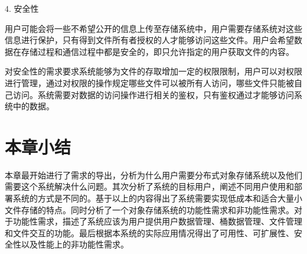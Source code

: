 4. 安全性

用户可能会将一些不希望公开的信息上传至存储系统中，用户需要存储系统对这些信息进行保护，只有得到文件所有者授权的人才能够访问这些文件。用户会希望数据在存储过程和通信过程中都是安全的，即只允许指定的用户获取文件的内容。

对安全性的需求要求系统能够为文件的存取增加一定的权限限制，用户可以对权限进行管理，通过对权限的操作规定哪些文件可以被所有人访问，哪些文件只能被自己访问。系统需要对数据的访问操作进行相关的鉴权，只有鉴权通过才能够访问系统中的数据。

\section{本章小结}%
本章最开始进行了需求的导出，分析为什么用户需要分布式对象存储系统以及他们需要这个系统解决什么问题。其次分析了系统的目标用户，阐述不同用户使用和部署系统的方式是不同的。基于以上的内容得出了系统需要实现低成本和适合大量小文件存储的特点。同时分析了一个对象存储系统的功能性需求和非功能性需求。对于功能性需求，描述了系统应该为用户提供用户数据管理、桶数据管理、文件管理和文件交互的功能。最后根据本系统的实际应用情况得出了可用性、可扩展性、安全性以及性能上的非功能性需求。 
